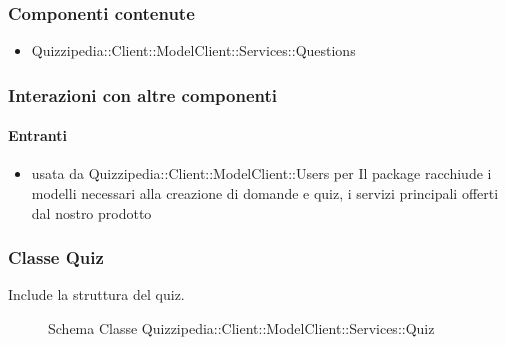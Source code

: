 \subsubsection{Componenti contenute}
\begin{itemize}
\item Quizzipedia::Client::ModelClient::Services::Questions
\end{itemize}
\subsubsection{Interazioni con altre componenti}
\paragraph{Entranti}
\begin{itemize}
\item usata da Quizzipedia::Client::ModelClient::Users per Il package racchiude i modelli necessari alla creazione di domande e quiz, i servizi principali offerti dal nostro prodotto
\end{itemize}
\subsubsection{Classe Quiz}
Include la struttura del quiz.
\begin{figure}[H]
\centering
\noindent{}
\caption[Schema Classe Quiz]{Schema Classe Quizzipedia::Client::ModelClient::Services::Quiz}
\end{figure}
